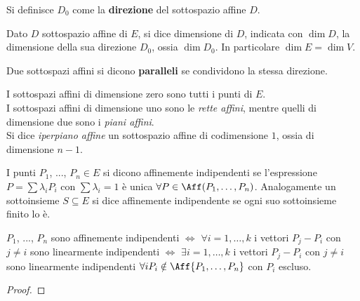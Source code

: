 \documentclass[11pt]{article}
\begin{document}
	\begin{definition} 
		Si definisce $D_0$ come la \textbf{direzione} del sottospazio affine $D$.
	\end{definition}

	\begin{definition} 
		Dato $D$ sottospazio affine di $E$, si dice dimensione di $D$,
		indicata con $\dim D$, la dimensione della sua direzione $D_0$, ossia
		$\dim D_0$. In particolare $\dim E = \dim V$.
	\end{definition}
	
	\begin{definition} 
		Due sottospazi affini si dicono \textbf{paralleli} se condividono
		la stessa direzione.
	\end{definition}

	\begin{remark}\nl
		\li I sottospazi affini di dimensione zero sono tutti i punti di $E$. \\
		\li I sottospazi affini di dimensione uno sono le \textit{rette affini},
		mentre quelli di dimensione due sono i \textit{piani affini}. \\
		\li Si dice \textit{iperpiano affine} un sottospazio affine di codimensione $1$,
		ossia di dimensione $n-1$.
	\end{remark}

	\begin{definition} 
		I punti $P_1$, ..., $P_n \in E$ si dicono affinemente indipendenti se l'espressione $P = \sum \lambda_i P_i$ con $\sum \lambda_i = 1$
		è unica $\forall P \in \Aff(P_1, \ldots, P_n)$. Analogamente
		un sottoinsieme $S \subseteq E$ si dice affinemente indipendente
		se ogni suo sottoinsieme finito lo è.
	\end{definition}

	\begin{proposition}
		$P_1$, ..., $P_n$ sono affinemente indipendenti $\iff$
		$\forall i = 1, \ldots, k$ i vettori $P_j - P_i$ con $j \neq i$
		sono linearmente indipendenti $\iff$ $\exists i = 1, \ldots, k$ i vettori $P_j - P_i$ con $j \neq i$
		sono linearmente indipendenti $\forall i P_i \notin \Aff\{P_1, \ldots, P_n\}$ con $P_i$ escluso.
	\end{proposition}

	\begin{proof}
	\end{proof}
\end{document}
